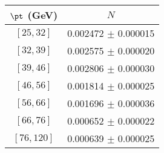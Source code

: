 \begin{tabular}{c||c}
$\pt$ (GeV) & $N$  \\
\hline
$[25, 32]$ & 0.002472 $\pm$ 0.000015\\
$[32, 39]$ & 0.002575 $\pm$ 0.000020\\
$[39, 46]$ & 0.002806 $\pm$ 0.000030\\
$[46, 56]$ & 0.001814 $\pm$ 0.000025\\
$[56, 66]$ & 0.001696 $\pm$ 0.000036\\
$[66, 76]$ & 0.000652 $\pm$ 0.000022\\
$[76, 120]$ & 0.000639 $\pm$ 0.000025\\
\end{tabular}

